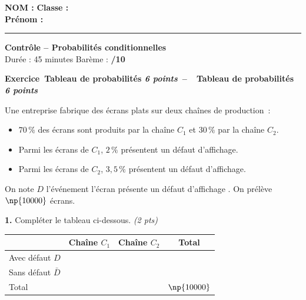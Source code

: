 \documentclass[11pt,a4paper]{article}
\newcounter{numexos}
\newcommand{\bex}[2]{%
\def\bextitle{#1}%
\addtocounter{numexos}{1}%
\begin{tcolorbox}[colback=white,colframe=black!30,arc=3pt,boxrule=0.6pt,
  left=4mm,right=4mm,top=1mm,bottom=2mm]%
  \textbf{Exercice~\thenumexos\ifx\bextitle\empty\else~--~~#1\fi}\par
  #2%
\end{tcolorbox}}
\renewcommand{\arraystretch}{1.6}
\begin{document}
\textbf{NOM :} \underline{\hspace{6cm}} \hfill \textbf{Classe :} \underline{\hspace{3cm}}\\[2mm]
\textbf{Prénom :} \underline{\hspace{5.5cm}}\\[4mm]
\hrule
\vspace{3mm}

\begin{titrebox}
\begin{center}
\textbf{\LARGE Contrôle -- Probabilités conditionnelles}\\[2mm]
\large Durée : 45 minutes \hfill Barème : \textbf{/10}
\end{center}
\end{titrebox}

\vspace{4mm}

\bex{Tableau de probabilités \hfill \normalfont\textit{6 points}}{%
\smallskip
Une entreprise fabrique des écrans plats sur deux chaînes de production~:
\begin{itemize}
  \item $70\,\%$ des écrans sont produits par la chaîne $C_1$ et $30\,\%$ par la chaîne $C_2$.
  \item Parmi les écrans de $C_1$, $2\,\%$ présentent un défaut d'affichage.
  \item Parmi les écrans de $C_2$, $3{,}5\,\%$ présentent un défaut d'affichage.
\end{itemize}
On note $D$ l'événement \og l'écran présente un défaut d'affichage \fg. On prélève $\np{10000}$ écrans.
}

\textbf{1.} Compléter le tableau ci-dessous. \hfill \textit{(2 pts)}

\begin{center}
\renewcommand{\arraystretch}{2.2}
\begin{tabular}{|L{4.5cm}|c|c|c|}
\hline
 & Chaîne $C_1$ & Chaîne $C_2$ & Total \\
\hline
Avec défaut $D$ & \hspace{2.5cm} & \hspace{2.5cm} & \\
\hline
Sans défaut $\bar{D}$ & & & \\
\hline
Total & & & $\np{10000}$ \\
\hline
\end{tabular}
\end{center}
\end{document}
